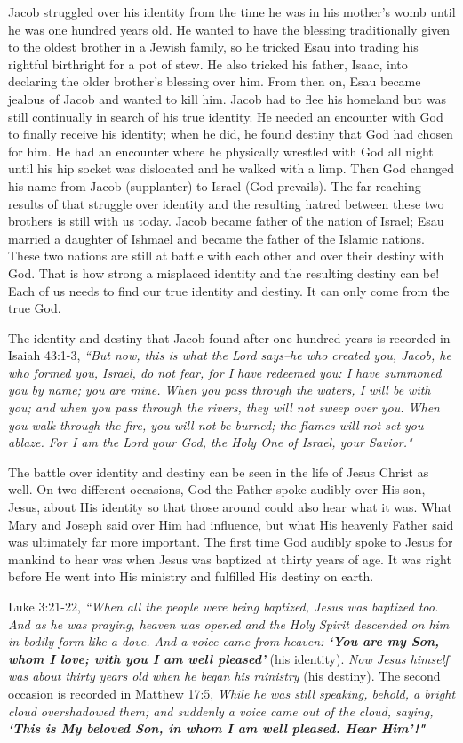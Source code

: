 \documentclass[oneside]{book}
\begin{document}
Jacob struggled over his identity from the time he was in his mother's womb until he was one hundred years old. He wanted to have the blessing traditionally given to the oldest brother in a Jewish family, so he tricked Esau into trading his rightful birthright for a pot of stew. He also tricked his father, Isaac, into declaring the older brother's blessing over him. From then on, Esau became jealous of Jacob and wanted to kill him. Jacob had to flee his homeland but was still continually in search of his true identity. He needed an encounter with God to finally receive his identity; when he did, he found destiny that God had chosen for him. He had an encounter where he physically wrestled with God all night until his hip socket was dislocated and he walked with a limp. Then God changed his name from Jacob (supplanter) to Israel (God prevails). The far-reaching results of that struggle over identity and the resulting hatred between these two brothers is still with us today. Jacob became father of the nation of Israel; Esau married a daughter of Ishmael and became the father of the Islamic nations. These two nations are still at battle with each other and over their destiny with God. That is how strong a misplaced identity and the resulting destiny can be! Each of us needs to find our true identity and destiny. It can only come from the true God.


The identity and destiny that Jacob found after one hundred years is recorded in Isaiah 43:1-3, \textit{``But now, this is what the Lord says--he who created you, Jacob, he who formed you, Israel, do not fear, for I have redeemed you: I have summoned you by name; you are mine. When you pass through the waters, I will be with you; and when you pass through the rivers, they will not sweep over you. When you walk through the fire, you will not be burned; the flames will not set you ablaze. For I am the Lord your God, the Holy One of Israel, your Savior."}

The battle over identity and destiny can be seen in the life of Jesus Christ as well. On two different occasions, God the Father spoke audibly over His son, Jesus, about His identity so that those around could also hear what it was. What Mary and Joseph said over Him had influence, but what His heavenly Father said was ultimately far more important. The first time God audibly spoke to Jesus for mankind to hear was when Jesus was baptized at thirty years of age. It was right before He went into His ministry and fulfilled His destiny on earth.

Luke 3:21-22, \textit{``When all the people were being baptized, Jesus was baptized too. And as he was praying, heaven was opened and the Holy Spirit descended on him in bodily form like a dove. And a voice came from heaven: \textbf{`You are my Son, whom I love; with you I am well pleased'}} (his identity). \textit{Now Jesus himself was about thirty years old when he began his ministry} (his destiny). The second occasion is recorded in Matthew 17:5, \textit{While he was still speaking, behold, a bright cloud overshadowed them; and suddenly a voice came out of the cloud, saying, \textbf{`This is My beloved Son, in whom I am well pleased. Hear Him'!"}}
\end{document}
